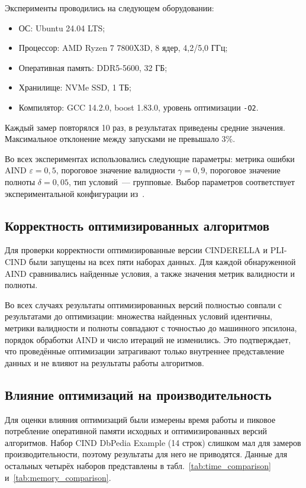 Эксперименты проводились на следующем оборудовании:

\begin{itemize}
    \item ОС: Ubuntu 24.04 LTS;
    \item Процессор: AMD Ryzen 7 7800X3D, 8 ядер, 4{,}2/5{,}0 ГГц;
    \item Оперативная память: DDR5-5600, 32 ГБ;
    \item Хранилище: NVMe SSD, 1 ТБ;
    \item Компилятор: GCC 14.2.0, boost 1.83.0, уровень оптимизации \texttt{-O2}.
\end{itemize}

Каждый замер повторялся 10 раз, в результатах приведены средние значения. Максимальное отклонение между запусками не превышало 3\%.

Во всех экспериментах использовались следующие параметры: метрика ошибки AIND $\varepsilon = 0{,}5$, пороговое значение валидности $\gamma = 0{,}9$, пороговое значение полноты $\delta = 0{,}05$, тип условий~--- групповые. Выбор параметров соответствует экспериментальной конфигурации из~\cite{abrosimov2025cinderella}.

\subsection{Корректность оптимизированных алгоритмов}

Для проверки корректности оптимизированные версии CINDERELLA и PLI-CIND были запущены на всех пяти наборах данных. Для каждой обнаруженной AIND сравнивались найденные условия, а также значения метрик валидности и полноты.

Во всех случаях результаты оптимизированных версий полностью совпали с результатами до оптимизации: множества найденных условий идентичны, метрики валидности и полноты совпадают с точностью до машинного эпсилона, порядок обработки AIND и число итераций не изменились. Это подтверждает, что проведённые оптимизации затрагивают только внутреннее представление данных и не влияют на результаты работы алгоритмов.

\subsection{Влияние оптимизаций на производительность}

Для оценки влияния оптимизаций были измерены время работы и пиковое потребление оперативной памяти исходных и оптимизированных версий алгоритмов. Набор CIND DbPedia Example (14 строк) слишком мал для замеров производительности, поэтому результаты для него не приводятся. Данные для остальных четырёх наборов представлены в табл.~\ref{tab:time_comparison} и~\ref{tab:memory_comparison}.


